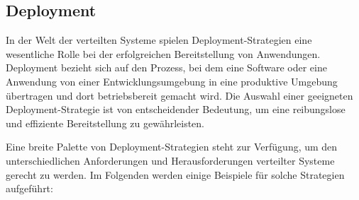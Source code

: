 \subsection{Deployment}


In der Welt der verteilten Systeme spielen Deployment-Strategien eine wesentliche Rolle bei der erfolgreichen Bereitstellung von Anwendungen. Deployment bezieht sich auf den Prozess, bei dem eine Software oder eine Anwendung von einer Entwicklungsumgebung in eine produktive Umgebung übertragen und dort betriebsbereit gemacht wird. Die Auswahl einer geeigneten Deployment-Strategie ist von entscheidender Bedeutung, um eine reibungslose und effiziente Bereitstellung zu gewährleisten.

Eine breite Palette von Deployment-Strategien steht zur Verfügung, um den unterschiedlichen Anforderungen und Herausforderungen verteilter Systeme gerecht zu werden. Im Folgenden werden einige Beispiele für solche Strategien aufgeführt:

